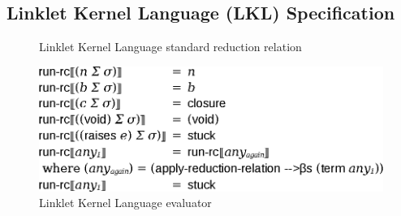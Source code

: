 \begin{appendices}



\chapter[\texorpdfstring{Linklet Kernel Language (LKL) Specification}{Appendix A}]{Linklet Kernel Language (LKL) Specification}
\label{appendix:linklet-kernel-language}


    \begin{figure}[h]
    \centering
    \caption{Linklet Kernel Language standard reduction relation}
    \label{fig:rc-red-relation}
    \end{figure}

    \begin{figure}[h]
    \centering
    \includegraphics[scale=1]{sections/figures/rc-run-rc.eps}
    \caption{Linklet Kernel Language evaluator}
    \label{fig:rc-run-rc}
    \end{figure}



\end{appendices}
